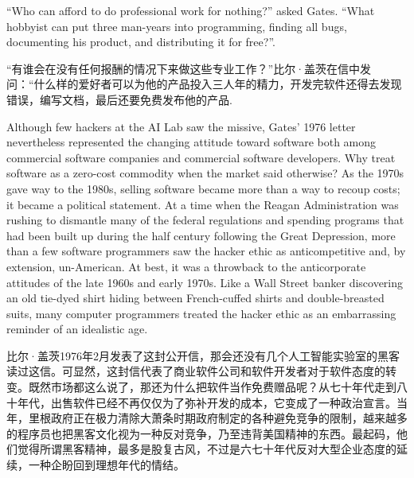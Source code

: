 \ifdefined\eng
``Who can afford to do professional work for nothing?'' asked Gates. ``What hobbyist can put three man-years into programming, finding all bugs, documenting his product, and distributing it for free?''.
\fi

\ifdefined\chs
``有谁会在没有任何报酬的情况下来做这些专业工作？''比尔·盖茨在信中发问：``什么样的爱好者可以为他的产品投入三人年的精力，开发完软件还得去发现错误，编写文档，最后还要免费发布他的产品.
\fi

\ifdefined\eng
Although few hackers at the AI Lab saw the missive, Gates' 1976 letter nevertheless represented the changing attitude toward software both among commercial software companies and commercial software developers. Why treat software as a zero-cost commodity when the market said otherwise? As the 1970s gave way to the 1980s, selling software became more than a way to recoup costs; it became a political statement. At a time when the Reagan Administration was rushing to dismantle many of the federal regulations and spending programs that had been built up during the half century following the Great Depression, more than a few software programmers saw the hacker ethic as anticompetitive and, by extension, un-American. At best, it was a throwback to the anticorporate attitudes of the late 1960s and early 1970s. Like a Wall Street banker discovering an old tie-dyed shirt hiding between French-cuffed shirts and double-breasted suits, many computer programmers treated the hacker ethic as an embarrassing reminder of an idealistic age.
\fi

\ifdefined\chs
比尔·盖茨1976年2月发表了这封公开信，那会还没有几个人工智能实验室的黑客读过这信。可显然，这封信代表了商业软件公司和软件开发者对于软件态度的转变。既然市场都这么说了，那还为什么把软件当作免费赠品呢？从七十年代走到八十年代，出售软件已经不再仅仅为了弥补开发的成本，它变成了一种政治宣言。当年，里根政府正在极力清除大萧条时期政府制定的各种避免竞争的限制，越来越多的程序员也把黑客文化视为一种反对竞争，乃至违背美国精神的东西。最起码，他们觉得所谓黑客精神，最多是股复古风，不过是六七十年代反对大型企业态度的延续，一种企盼回到理想年代的情结。
\fi

